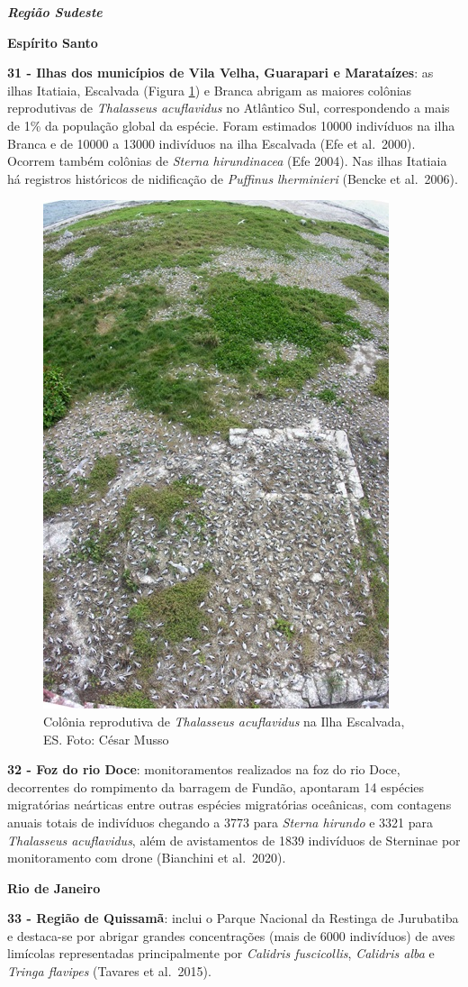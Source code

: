 \documentclass[
  oneside]{scrbook}
\begin{document}
\textbf{\emph{Região Sudeste}}

\textbf{Espírito Santo}

\textbf{31 - Ilhas dos municípios de Vila Velha, Guarapari e Marataízes}: as ilhas Itatiaia, Escalvada (Figura \ref{fig:25}) e Branca abrigam as maiores colônias reprodutivas de \emph{Thalasseus acuflavidus} no Atlântico Sul, correspondendo a mais de 1\% da população global da espécie. Foram estimados 10000 indivíduos na ilha Branca e de 10000 a 13000 indivíduos na ilha Escalvada (Efe et al.~2000). Ocorrem também colônias de \emph{Sterna hirundinacea} (Efe 2004). Nas ilhas Itatiaia há registros históricos de nidificação de \emph{Puffinus lherminieri} (Bencke et al.~2006).

\begin{figure}[H]

{\centering \includegraphics[width=0.4\linewidth]{imagens/cap07/Figura_7.5} 

}

\caption{Colônia reprodutiva de \emph{Thalasseus acuflavidus} na Ilha Escalvada, ES. Foto: César Musso}\label{fig:25}
\end{figure}



\textbf{32 - Foz do rio Doce}: monitoramentos realizados na foz do rio Doce, decorrentes do rompimento da barragem de Fundão, apontaram 14 espécies migratórias neárticas entre outras espécies migratórias oceânicas, com contagens anuais totais de indivíduos chegando a 3773 para \emph{Sterna hirundo} e 3321 para \emph{Thalasseus acuflavidus}, além de avistamentos de 1839 indivíduos de Sterninae por monitoramento com drone (Bianchini et al.~2020).

\textbf{Rio de Janeiro}

\textbf{33 - Região de Quissamã}: inclui o Parque Nacional da Restinga de Jurubatiba e destaca-se por abrigar grandes concentrações (mais de 6000 indivíduos) de aves limícolas representadas principalmente por \emph{Calidris fuscicollis}, \emph{Calidris alba} e \emph{Tringa flavipes} (Tavares et al.~2015).
\end{document}
